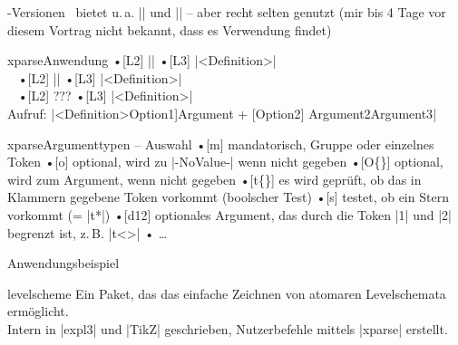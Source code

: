 \documentclass[t]{beamer}
\begin{document}
\begin{frame}[fragile]{\LaTeXe-Versionen}
\LaTeXe\ bietet u.\,a. |\@nameuse| und |\@namedef| – aber recht selten genutzt (mir bis 4 Tage vor diesem Vortrag nicht bekannt, dass es Verwendung findet)
\end{frame}


\begin{frame}[fragile]{xparse}{Anwendung}
•[L2] |\newcommand\mycommand[2]{<Definition>}|
•[L3] |\NewDocumentCommand\mycommand{mm}{<Definition>}|\\%
~\pause
•[L2] |\newcommand\mycommand[opt][2]{<Definition>}|
•[L3] |\NewDocumentCommand\mycommand{O{opt}m}{<Definition>}|\\%
~\pause
•[L2] ???
•[L3] |\NewDocumentCommand\mycommand{sO{opt}mt{+}O{2nd opt}mm}{<...>}|\\%
Aufruf: |\mycommand*[Option1]{Argument} + [Option2] {Argument2}{Argument3}|
\•
\end{frame}

\begin{frame}[fragile]{xparse}{Argumenttypen – Auswahl}
•[m] mandatorisch, Gruppe oder einzelnes Token
•[o] optional, wird zu |-NoValue-| wenn nicht gegeben
•[O\{\}] optional, wird zum Argument, wenn nicht gegeben
•[t\{\}] es wird geprüft, ob das in Klammern gegebene Token vorkommt (boolscher Test)
•[s] testet, ob ein Stern vorkommt (= |t{*}|)
•[d12] optionales Argument, das durch die Token |1| und |2| begrenzt ist, z.\,B. |t<>|
• …
\•
\end{frame}

\begin{frame}{Anwendungsbeispiel}
\begin{block}{levelscheme}
Ein Paket, das das einfache Zeichnen von atomaren Levelschemata ermöglicht.\\
Intern in |expl3| und |TikZ| geschrieben, Nutzerbefehle mittels |xparse| erstellt.
\end{block}
\end{frame}
\end{document}
